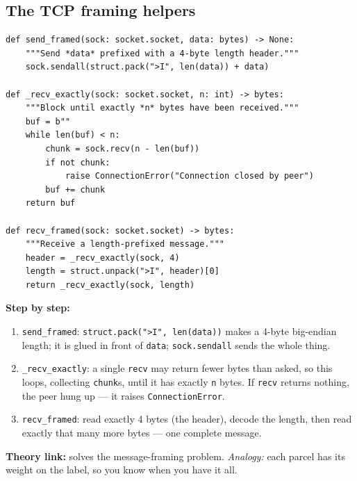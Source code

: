 \documentclass[11pt,a4paper]{report}
\begin{document}
\subsection{The TCP framing helpers}
\begin{lstlisting}[style=py,caption={vehicle\_node.py --- length-prefix framing helpers.}]
def send_framed(sock: socket.socket, data: bytes) -> None:
    """Send *data* prefixed with a 4-byte length header."""
    sock.sendall(struct.pack(">I", len(data)) + data)

def _recv_exactly(sock: socket.socket, n: int) -> bytes:
    """Block until exactly *n* bytes have been received."""
    buf = b""
    while len(buf) < n:
        chunk = sock.recv(n - len(buf))
        if not chunk:
            raise ConnectionError("Connection closed by peer")
        buf += chunk
    return buf

def recv_framed(sock: socket.socket) -> bytes:
    """Receive a length-prefixed message."""
    header = _recv_exactly(sock, 4)
    length = struct.unpack(">I", header)[0]
    return _recv_exactly(sock, length)
\end{lstlisting}
\textbf{Step by step:}
\begin{enumerate}
  \item \texttt{send\_framed}: \texttt{struct.pack(">I", len(data))} makes a
        4-byte big-endian length; it is glued in front of \texttt{data};
        \texttt{sock.sendall} sends the whole thing.
  \item \texttt{\_recv\_exactly}: a single \texttt{recv} may return fewer bytes
        than asked, so this loops, collecting \texttt{chunk}s, until it has
        exactly \texttt{n} bytes. If \texttt{recv} returns nothing, the peer hung
        up --- it raises \texttt{ConnectionError}.
  \item \texttt{recv\_framed}: read exactly 4 bytes (the header), decode the
        length, then read exactly that many more bytes --- one complete message.
\end{enumerate}
\textbf{Theory link:} solves the message-framing problem. \emph{Analogy:} each
parcel has its weight on the label, so you know when you have it all.
\end{document}
